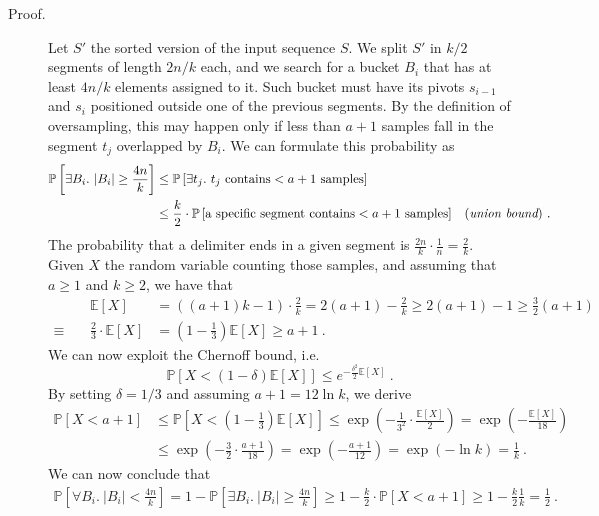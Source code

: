 \begin{enumerate}
\begin{description}
    \item[Proof.] Let $S'$ the sorted version of the input sequence $S$. We
    split $S'$ in $k/2$ segments of length $2n/k$ each, and we search for a
    bucket $B_i$ that has at least $4n/k$ elements assigned to it. Such bucket
    must have its pivots $s_{i-1}$ and $s_i$ positioned outside one of the
    previous segments. By the definition of oversampling, this may happen only
    if less than $a + 1$ samples fall in the segment $t_j$ overlapped by $B_i$.
    We can formulate this probability as
    \begin{align*}
      \mathbb{P}\left[\exists B_i.\ |B_i| \ge \frac{4n}{k} \right] &\le
      \mathbb{P}\left[\exists t_j.\ t_j \text{ contains} < a + 1 \text{ samples}
      \right] && \\ &\le \frac{k}{2}\cdot\mathbb{P}\left[ \text{a specific
      segment contains} < a + 1 \text{ samples} \right] && (\text{\it union
      bound})\ .
    \end{align*}
    The probability that a delimiter ends in a given segment is
    $\frac{2n}{k}\cdot\frac{1}{n} = \frac{2}{k}$. Given $X$ the random variable
    counting those samples, and assuming that $a \ge 1$ and $k \ge 2$, we have
    that
    \begin{align*}
      && \mathbb{E}\left[X\right] &= \left(\left(a + 1 \right)k - 1\right)\cdot
      \frac{2}{k} = 2\left(a + 1 \right) - \frac{2}{k} \ge 2\left(a + 1 \right)
      - 1 \ge \frac{3}{2}\left(a + 1 \right) \\ \equiv\ &&
      \frac{2}{3}\cdot\mathbb{E}\left[X\right] &= \left(1 -
      \frac{1}{3}\right)\mathbb{E}\left[X\right] \ge a + 1\ .
    \end{align*}
    We can now exploit the Chernoff bound, i.e. $$\mathbb{P}\left[ X < (1 -
    \delta)\mathbb{E}[X] \right] \le e^{-\frac{\delta^2}{2}\mathbb{E}[X]}\ .$$
    By setting $\delta = 1/3$ and assuming $a + 1 = 12\ln k$, we derive
    \begin{align*}
      \mathbb{P}\left[X < a + 1 \right] &\le \mathbb{P}\left[X < \left(1 -
      \frac{1}{3}\right)\mathbb{E}\left[X\right] \right] \le
      \exp\left({-\frac{1}{3^2}\cdot\frac{\mathbb{E}\left[X\right]}{2}}\right) =
      \exp\left({-\frac{\mathbb{E}\left[X\right]}{18}}\right) \\ &\le
      \exp\left({-\frac{3}{2}\cdot\frac{a + 1}{18}}\right) = \exp\left({-\frac{a
      + 1}{12}}\right) = \exp(-\ln k) = \frac{1}{k}\ .
    \end{align*}
    We can now conclude that
    \begin{align*}
      \mathbb{P}\left[\forall B_i.\ |B_i| < \frac{4n}{k} \right] = 1 -
      \mathbb{P}\left[\exists B_i.\ |B_i| \ge \frac{4n}{k} \right] \ge 1 -
      \frac{k}{2}\cdot\mathbb{P}\left[X < a + 1 \right] \ge 1 -
      \frac{k}{2}\frac{1}{k} = \frac{1}{2}\ .
    \end{align*}

  \end{description}

\end{enumerate}
